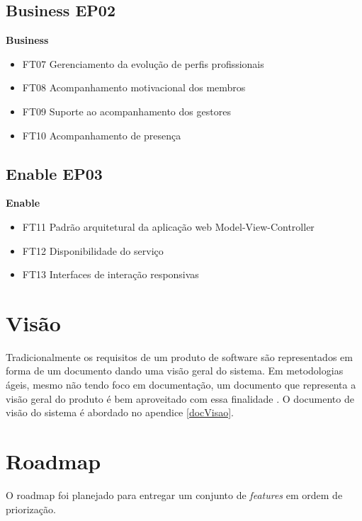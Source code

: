 \subsection{Business EP02}
\textbf{Business}
\begin{itemize}
    \item FT07 Gerenciamento da evolução de perfis profissionais
    \item FT08 Acompanhamento motivacional dos membros
    \item FT09 Suporte ao acompanhamento dos gestores
    \item FT10 Acompanhamento de presença
\end{itemize}
\subsection{Enable EP03}
\textbf{Enable}
\begin{itemize}
    \item FT11 Padrão arquitetural da aplicação web Model-View-Controller
    \item FT12 Disponibilidade do serviço
    \item FT13 Interfaces de interação responsivas
\end{itemize}
\section{Visão}

Tradicionalmente os requisitos de um produto de software são representados em forma de um documento dando uma visão geral do sistema. Em metodologias ágeis, mesmo não tendo foco em documentação, um documento que representa a visão geral do produto é bem aproveitado com essa finalidade \cite{leffingwell2011}. O documento de visão do sistema é abordado no apendice \ref{docVisao}.

\section{Roadmap}

O roadmap foi planejado para entregar um conjunto de \textit{features} em ordem de priorização.

